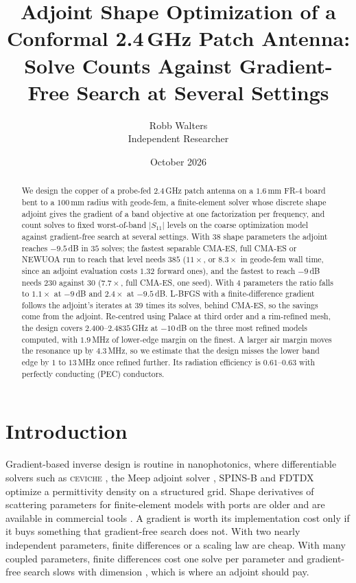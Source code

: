\documentclass{anvil-paper}
\title{Adjoint Shape Optimization of a Conformal 2.4\,GHz Patch Antenna:
Solve Counts Against Gradient-Free Search at Several Settings}
\author{Robb Walters\\
  {\normalsize Independent Researcher}}
\date{October 2026}
\begin{document}
\maketitle

\begin{abstract}
We design the copper of a probe-fed 2.4\,GHz patch antenna on a $1.6$\,mm
FR-4 board bent to a $100$\,mm radius with geode-fem, a finite-element
solver whose discrete shape adjoint gives the gradient of a band objective
at one factorization per frequency, and count solves to fixed worst-of-band
$|S_{11}|$ levels on the coarse optimization model against gradient-free
search at several settings. With 38 shape parameters the adjoint reaches
$-9.5$\,dB in $35$ solves; the fastest separable CMA-ES, full CMA-ES or
NEWUOA run to reach that level needs $385$ ($11\times$, or $8.3\times$ in
geode-fem wall time, since an adjoint evaluation costs $1.32$ forward ones), and the
fastest to reach $-9$\,dB needs $230$ against $30$ ($7.7\times$, full CMA-ES,
one seed). With 4 parameters the ratio falls to $1.1\times$ at $-9$\,dB and
$2.4\times$ at $-9.5$\,dB. L-BFGS with a finite-difference gradient follows the
adjoint's iterates at $39$ times its solves, behind CMA-ES, so the savings
come from the adjoint. Re-centred using Palace at third order and a
rim-refined mesh, the design covers $2.400$--$2.4835$\,GHz at $-10$\,dB on the
three most refined models computed, with $1.9$\,MHz of lower-edge margin on
the finest. A larger air margin moves the resonance up by $4.3$\,MHz, so we
estimate that the design misses the lower band edge by $1$ to $13$\,MHz once
refined further. Its radiation efficiency is $0.61$--$0.63$ with perfectly
conducting (PEC) conductors.
\end{abstract}

\section{Introduction}
\label{sec:intro}

Gradient-based inverse design is routine in nanophotonics, where
differentiable solvers such as \textsc{ceviche} \citep{hughes2019forward},
the Meep adjoint solver \citep{hammond2022meepadjoint}, SPINS-B
\citep{su_spinsb} and FDTDX \citep{mahlau2026fdtdx} optimize a permittivity
density on a structured grid. Shape derivatives of scattering parameters for
finite-element models with ports are older
\citep{webb2000design,georgieva2002feasible,nikolova2004adjoint} and are
available in commercial tools
\citep{ansys_hfss_derivatives,comsol_sensitivity_method}. A gradient is worth
its implementation cost only if it buys something that gradient-free search
does not. With two nearly independent parameters, finite differences or a
scaling law are cheap. With many coupled parameters, finite differences cost
one solve per parameter and gradient-free search slows with dimension
\citep{rios2013derivative}, which is where an adjoint should pay.
\end{document}
